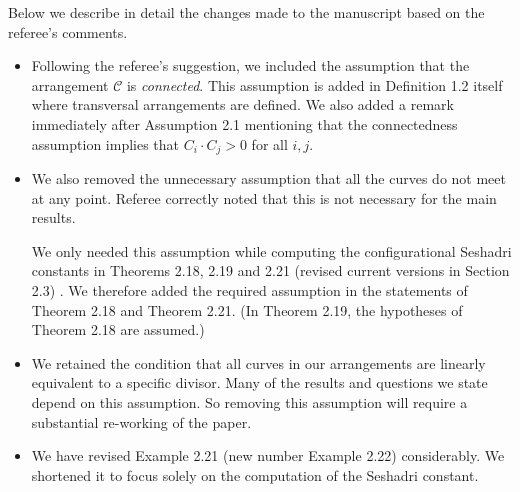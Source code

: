 \documentclass[12pt,twoside,reqno]{amsart}
\numberwithin{equation}{section}
\theoremstyle{definition}
\begin{document}
Below we describe in detail the changes made to the manuscript based on the referee's comments. 
\begin{itemize}
\item Following the referee's suggestion, we included the assumption that the arrangement $\mathcal{C}$ is \textit{connected}. 
This assumption is added in Definition 1.2 itself where transversal arrangements are defined. 
We also added a remark immediately after Assumption 2.1 mentioning that the connectedness assumption implies that $C_i \cdot C_j > 0$ for all $i,j$.

\item We also removed the unnecessary assumption that all the curves do not meet at any point. Referee correctly noted that this is not necessary for the main results. 

We only needed this assumption while computing the configurational Seshadri constants in  Theorems 2.18, 2.19 and 2.21 (revised current versions in Section 2.3) . We therefore added the required assumption in the statements of Theorem 2.18 and Theorem 2.21. (In Theorem 2.19, the hypotheses of Theorem 2.18 are assumed.)

\item We retained the condition that all curves in our arrangements are linearly equivalent to a specific divisor. Many of the results and questions we state depend on this assumption. So removing this assumption will require a substantial re-working of the paper. 


\item We have revised Example 2.21 (new number Example 2.22) considerably. We shortened it to focus solely on the computation of the Seshadri constant.
\end{itemize}


\end{document}
